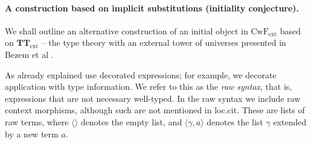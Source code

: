 \documentclass[11pt,a4paper]{article}
\theoremstyle{plain}
\theoremstyle{definition}
\newcommand{\tuple}[1]{\langle #1 \rangle}
\def\CwF{\mathrm{CwF}}
\def\CwFext{\mathrm{CwF_{ext}}}
\def\Sigmaext{{\Sigma^\mathrm{ext}}}
\def\TText{{\mathbf{TT}_\mathrm{ext}}}
\begin{document}
\paragraph{A construction based on implicit substitutions (initiality conjecture).}
We shall outline an alternative construction of an initial object in $\CwFext$ based on $\TText$ -- the type theory with an external tower of universes presented in Bezem et al \cite{BezemCDE22}. 

As already explained use decorated expressions; for example, we decorate application with type information. We refer to this as the {\em raw syntax}, that is, expressions that are not necessary well-typed. In the raw syntax we include raw context morphisms, although such are not mentioned in loc.cit. These are lists of raw terms, where $\tuple{}$ denotes the empty list, and $\tuple{\gamma,a}$ denotes the list $\gamma$ extended by a new term $a$.
\end{document}
